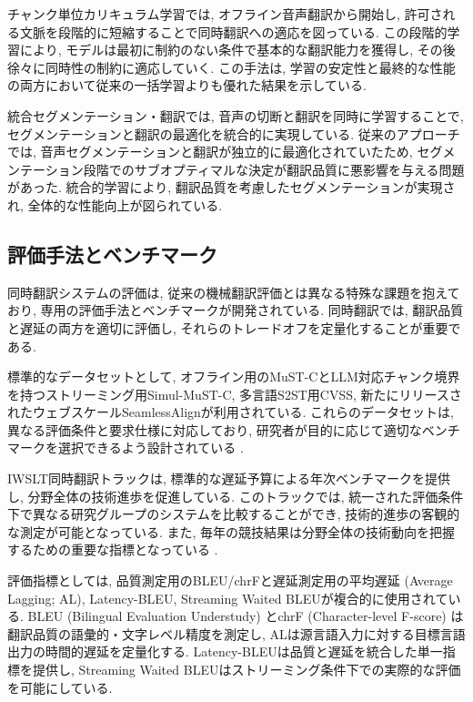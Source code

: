 チャンク単位カリキュラム学習では, オフライン音声翻訳から開始し, 許可される文脈を段階的に短縮することで同時翻訳への適応を図っている.
この段階的学習により, モデルは最初に制約のない条件で基本的な翻訳能力を獲得し, その後徐々に同時性の制約に適応していく.
この手法は, 学習の安定性と最終的な性能の両方において従来の一括学習よりも優れた結果を示している.

統合セグメンテーション・翻訳では, 音声の切断と翻訳を同時に学習することで, セグメンテーションと翻訳の最適化を統合的に実現している.
従来のアプローチでは, 音声セグメンテーションと翻訳が独立的に最適化されていたため, セグメンテーション段階でのサブオプティマルな決定が翻訳品質に悪影響を与える問題があった.
統合的学習により, 翻訳品質を考慮したセグメンテーションが実現され, 全体的な性能向上が図られている.

\subsection{評価手法とベンチマーク}

同時翻訳システムの評価は, 従来の機械翻訳評価とは異なる特殊な課題を抱えており, 専用の評価手法とベンチマークが開発されている.
同時翻訳では, 翻訳品質と遅延の両方を適切に評価し, それらのトレードオフを定量化することが重要である.

標準的なデータセットとして, オフライン用のMuST-CとLLM対応チャンク境界を持つストリーミング用Simul-MuST-C, 多言語S2ST用CVSS, 新たにリリースされたウェブスケールSeamlessAlignが利用されている.
これらのデータセットは, 異なる評価条件と要求仕様に対応しており, 研究者が目的に応じて適切なベンチマークを選択できるよう設計されている \cite{digangi2019mustc,makinae2024simulmustc,jia2022cvss}.

IWSLT同時翻訳トラックは, 標準的な遅延予算による年次ベンチマークを提供し, 分野全体の技術進歩を促進している.
このトラックでは, 統一された評価条件下で異なる研究グループのシステムを比較することができ, 技術的進歩の客観的な測定が可能となっている.
また, 毎年の競技結果は分野全体の技術動向を把握するための重要な指標となっている \cite{iwslt2024track}.

評価指標としては, 品質測定用のBLEU/chrFと遅延測定用の平均遅延 (Average Lagging; AL), Latency-BLEU, Streaming Waited BLEUが複合的に使用されている.
BLEU (Bilingual Evaluation Understudy) とchrF (Character-level F-score) は翻訳品質の語彙的・文字レベル精度を測定し, ALは源言語入力に対する目標言語出力の時間的遅延を定量化する.
Latency-BLEUは品質と遅延を統合した単一指標を提供し, Streaming Waited BLEUはストリーミング条件下での実際的な評価を可能にしている.

